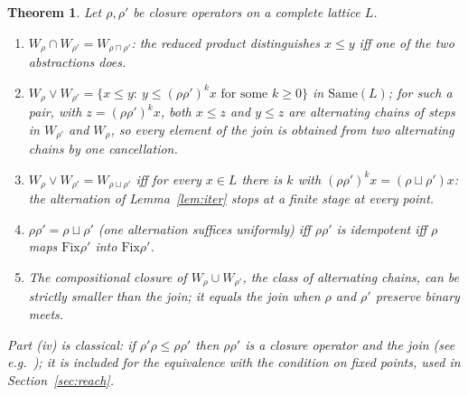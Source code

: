 \documentclass[11pt]{amsart}
\newtheorem{thm}{Theorem}[section]
\theoremstyle{definition}
\newcommand{\Same}{\mathrm{Same}}
\newcommand{\Fix}{\mathrm{Fix}}
\begin{document}
\begin{thm}\label{thm:lattice}
Let $\rho,\rho'$ be closure operators on a complete lattice $L$.
\begin{enumerate}
\item[(i)] $W_\rho\cap W_{\rho'}=W_{\rho\sqcap\rho'}$: the reduced product
distinguishes $x\le y$ iff one of the two abstractions does.
\item[(ii)] $W_\rho\vee W_{\rho'}=\{x\le y:\ y\le(\rho\rho')^kx\text{ for
some }k\ge0\}$ in $\Same(L)$; for such a pair, with $z=(\rho\rho')^kx$,
both $x\le z$ and $y\le z$ are alternating chains of steps in $W_{\rho'}$
and $W_\rho$, so every element of the join is obtained from two alternating
chains by one cancellation.
\item[(iii)] $W_\rho\vee W_{\rho'}=W_{\rho\sqcup\rho'}$ iff for every $x\in
L$ there is $k$ with $(\rho\rho')^kx=(\rho\sqcup\rho')x$: the alternation
of Lemma~\ref{lem:iter} stops at a finite stage at every point.
\item[(iv)] $\rho\rho'=\rho\sqcup\rho'$ (one alternation suffices
uniformly) iff $\rho\rho'$ is idempotent iff $\rho$ maps $\Fix\rho'$ into
$\Fix\rho'$.
\item[(v)] The compositional closure of $W_\rho\cup W_{\rho'}$, the class of
alternating chains, can be strictly smaller than the join; it equals the
join when $\rho$ and $\rho'$ preserve binary meets.
\end{enumerate}
Part (iv) is classical: if $\rho'\rho\le\rho\rho'$ then $\rho\rho'$ is a
closure operator and the join (see e.g.\ \cite[p.~7]{Dacar}); it is
included for the equivalence with the condition on fixed points, used
in Section~\ref{sec:reach}.
\end{thm}
\end{document}
